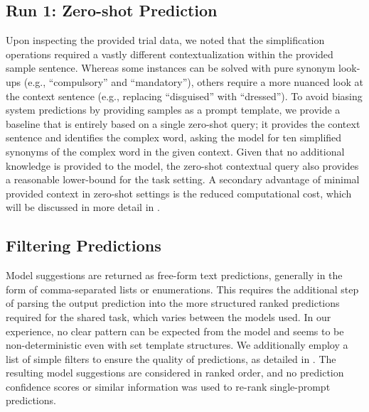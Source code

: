 \documentclass[11pt]{article}
\newcommand{\todo}[1]{\textcolor{red}{TODO: #1}}
\begin{document}
\subsection{Run 1: Zero-shot Prediction}
Upon inspecting the provided trial data, we noted that the simplification operations required a vastly different contextualization within the provided sample sentence. Whereas some instances can be solved with pure synonym look-ups (e.g., ``compulsory'' and ``mandatory''), others require a more nuanced look at the context sentence (e.g., replacing ``disguised'' with ``dressed'').
To avoid biasing system predictions by providing samples as a prompt template, we provide a baseline that is entirely based on a single zero-shot query; it provides the context sentence and identifies the complex word, asking the model for ten simplified synonyms of the complex word in the given context.
Given that no additional knowledge is provided to the model, the zero-shot contextual query also provides a reasonable lower-bound for the task setting.
A secondary advantage of minimal provided context in zero-shot settings is the reduced computational cost, which will be discussed in more detail in 
.

\subsection{Filtering Predictions}
Model suggestions are returned as free-form text predictions, generally in the form of comma-separated lists or enumerations.
This requires the additional step of parsing the output prediction into the more structured ranked predictions required for the shared task, which varies between the models used.
In our experience, no clear pattern can be expected from the model and seems to be non-deterministic even with set template structures.
We additionally employ a list of simple filters to ensure the quality of predictions, as detailed in .
The resulting model suggestions are considered in ranked order, and no prediction confidence scores or similar information was used to re-rank single-prompt predictions.
\end{document}
